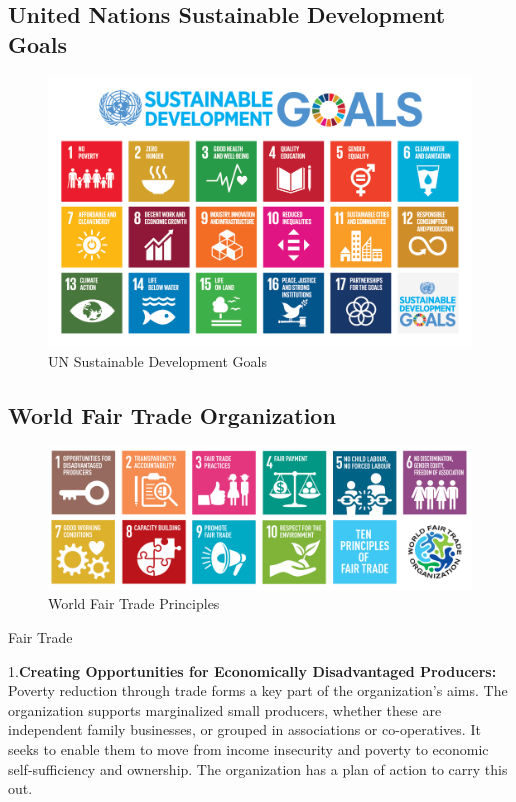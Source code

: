 \documentclass[]{book}
\begin{document}
\hypertarget{united-nations-sustainable-development-goals}{%
\subsection{United Nations Sustainable Development Goals}\label{united-nations-sustainable-development-goals}}

\begin{figure}
\centering
\includegraphics{images/sustainabledevelopgoals.png}
\caption{UN Sustainable Development Goals}
\end{figure}

\hypertarget{world-fair-trade-organization}{%
\subsection{World Fair Trade Organization}\label{world-fair-trade-organization}}

\begin{figure}
\centering
\includegraphics{images/WFTO-10-principles-900px.png}
\caption{World Fair Trade Principles}
\end{figure}

Fair Trade

1.\textbf{Creating Opportunities for Economically Disadvantaged Producers:}
Poverty reduction through trade forms a key part of the organization's aims. The organization supports marginalized small producers, whether these are independent family businesses, or grouped in associations or co-operatives. It seeks to enable them to move from income insecurity and poverty to economic self-sufficiency and ownership. The organization has a plan of action to carry this out.
\end{document}
